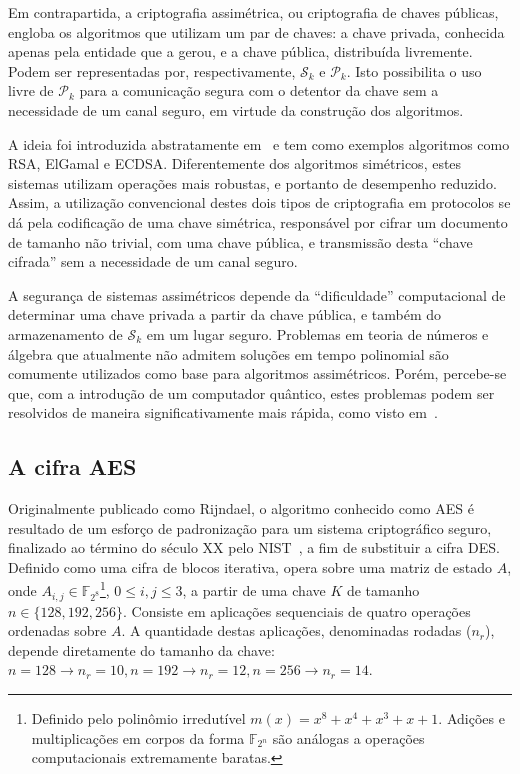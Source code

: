 \documentclass{ufsctex/ufsctex}
\newcommand{\pk}{\mathcal{P}_k}
\newcommand{\sk}{\mathcal{S}_k}
\begin{document}
Em contrapartida, a criptografia assimétrica, ou criptografia de chaves
públicas, engloba os algoritmos que utilizam um par de chaves: a chave privada,
conhecida apenas pela entidade que a gerou, e a chave pública, distribuída
livremente. Podem ser representadas por, respectivamente, $\sk{}$ e $\pk{}$.
Isto possibilita o uso livre de $\pk{}$ para a comunicação segura com o
detentor da chave sem a necessidade de um canal seguro, em virtude da
construção dos algoritmos.

A ideia foi introduzida abstratamente em~\cite{Diffie:article:1976:sep}
e tem como exemplos algoritmos como RSA, ElGamal e
ECDSA.
Diferentemente dos algoritmos simétricos, estes sistemas utilizam operações
mais robustas, e portanto de desempenho reduzido. Assim, a utilização
convencional destes dois tipos de criptografia em protocolos se dá pela
codificação de uma chave simétrica, responsável por cifrar um documento de
tamanho não trivial, com uma chave pública, e transmissão desta ``chave
cifrada'' sem a necessidade de um canal seguro.

A segurança de sistemas assimétricos depende da ``dificuldade'' computacional
de determinar uma chave privada a partir da chave pública, e também do
armazenamento de $\sk{}$ em um lugar seguro. Problemas em teoria de números e
álgebra que atualmente não admitem soluções em tempo polinomial são comumente
utilizados como base para algoritmos assimétricos.  Porém, percebe-se que, com
a introdução de um computador quântico, estes problemas podem ser resolvidos de
maneira significativamente mais rápida, como visto
em~\cite{Shor:article:1997:oct}.

\subsection{A cifra AES}\label{subsection:aes}

Originalmente publicado como Rijndael, o algoritmo conhecido como
AES é resultado de um esforço
de padronização para um sistema criptográfico seguro, finalizado ao término do
século XX pelo NIST~\cite{Dworkin:report:2001:nov}, a fim de substituir a cifra
DES. Definido como uma cifra de
blocos iterativa, opera sobre uma matriz de estado $A$, onde $A_{i, j} \in
\mathbb{F}_{2^{8}}$\footnote{Definido pelo polinômio irredutível $m(x) = x^{8} + x^{4} + x^{3}
+ x + 1$. Adições e multiplicações em corpos da forma $\mathbb{F}_{2^n}$ são
análogas a operações computacionais extremamente baratas.}, $0 \leq i, j \leq
3$, a partir de uma chave $K$ de tamanho $n \in \{128, 192, 256\}$. Consiste em
aplicações sequenciais de quatro operações ordenadas sobre $A$. A quantidade
destas aplicações, denominadas rodadas ($n_r$), depende diretamente do tamanho
da chave: $n = 128 \rightarrow n_r = 10, n = 192 \rightarrow n_r = 12, n = 256
\rightarrow n_r = 14$.
\end{document}
